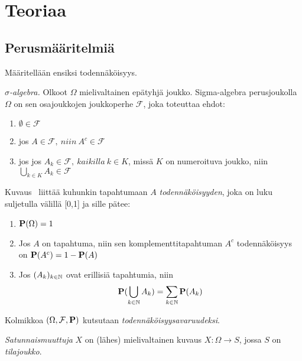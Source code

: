 


\chapter{Teoriaa}\label{teor}

\section{Perusmääritelmiä}

Määritellään ensiksi todennäköisyys.

\begin{maar}
	\textit{$\sigma$-algebra.} Olkoot $\Omega$ mielivaltainen epätyhjä joukko. Sigma-algebra perusjoukolla $\Omega$ on sen osajoukkojen joukkoperhe $\mathcal{F}$, joka toteuttaa ehdot:
	
	\begin{enumerate}
		\item $\emptyset\in\mathcal{F}$
		\item jos $A\in\mathcal{F},\ niin\ A^c \in\mathcal{F}$
		\item jos jos $A_k\in\mathcal{F},\ kaikilla\ k\in K$, missä $K$ on numeroituva joukko, niin $\bigcup_{k\in K} A_k \in \mathcal{F}$
	\end{enumerate}
\end{maar}

\begin{maar}
	Kuvaus \pr\ liittää kuhunkin tapahtumaan $A$ \textit{todennäköisyyden}, joka on luku suljetulla välillä [0,1] ja sille pätee:
	\begin{enumerate}
		\item $\textbf{P}(\Omega)=1$
		\item Jos $A$ on tapahtuma, niin sen komplementtitapahtuman $A^c$ todennäköisyys on $\textbf{P}(A^c)= 1 - \textbf{P}(A)$
		\item Jos $(A_k)_{k\in\mathbb{N}}$ ovat erillisiä tapahtumia, niin 
		\begin{displaymath}
			\textbf{P}(\bigcup_{k\in\mathbb{N}} A_k) = \sum_{k\in\mathbb{N}}\textbf{P}(A_k)
		\end{displaymath}
	\end{enumerate}
\end{maar}

\begin{maar}
	Kolmikkoa $(\Omega, \mathcal{F}, \textbf{P} )$ kutsutaan \textit{todennäköisyysavaruudeksi}.
\end{maar}

\begin{maar}
	\textit{Satunnaismuuttuja} $X$ on (lähes) mielivaltainen kuvaus $X:\Omega\rightarrow S$, jossa $S$ on \textit{tilajoukko}. 
\end{maar}

